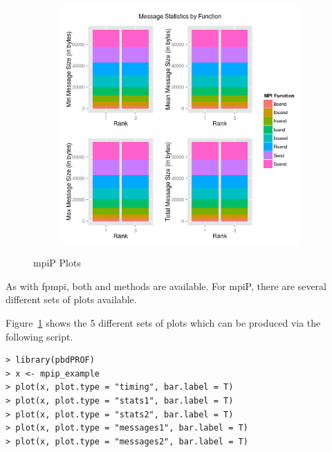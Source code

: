 \begin{figure}
\begin{subfigure}[b]{0.485\textwidth}
        \end{subfigure}\\
        \begin{subfigure}[b]{0.485\textwidth}
            \includegraphics[width=\textwidth]{include/pics/mpip/05_message2}
        \end{subfigure}%
        \caption{mpiP Plots}
        \label{fig:mpip}
\end{figure}


As with fpmpi, both  and  methods are available.  For mpiP, there are several different sets of plots available.

Figure~\ref{fig:mpip} shows the 5 different sets of plots which can be produced via the following script.
\begin{lstlisting}[language=rr]
> library(pbdPROF)
> x <- mpip_example
> plot(x, plot.type = "timing", bar.label = T)
> plot(x, plot.type = "stats1", bar.label = T)
> plot(x, plot.type = "stats2", bar.label = T)
> plot(x, plot.type = "messages1", bar.label = T)
> plot(x, plot.type = "messages2", bar.label = T)
\end{lstlisting}
